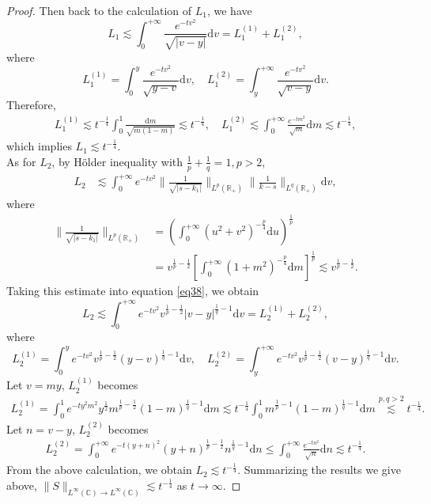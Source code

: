 \documentclass[10pt,a4paper]{amsart}
\begin{document}
\begin{proof}
Then back to the calculation of $L_1$, we have
\begin{equation}
    L_1\lesssim\int_0^{+\infty}\frac{e^{-t v^2}}{\sqrt{|v-y|}}\mathrm{d}v=L_1^{(1)}+L_1^{(2)},
\end{equation}
where
\begin{equation*}
     L_1^{(1)}=\int_0^{y}\frac{e^{-t v^2}}{\sqrt{y-v}}\mathrm{d}v,\quad L_1^{(2)}=\int_y^{+\infty}\frac{e^{-t v^2}}{\sqrt{v-y}}\mathrm{d}v.
\end{equation*}
Therefore,
\begin{align*}
     L_1^{(1)}\lesssim t^{-\frac{1}{4}}\int_0^1\frac{\mathrm{d}m}{\sqrt{m(1-m)}}\lesssim t^{-\frac{1}{4}},\quad L_1^{(2)}\lesssim \int_0^{+\infty}\frac{e^{-tm^2}}{\sqrt{m}}\mathrm{d}m\lesssim t^{-\frac{1}{4}},
\end{align*}
which implies $L_1\lesssim t^{-\frac{1}{4}}$.\\
As for $L_2$, by H\"older inequality with $\frac{1}{p} + \frac{1}{q} = 1,p>2$,
\begin{align}\label{eq38}
    L_2&\lesssim \int_0^{+\infty}e^{-t v^2}\|\frac{1}{\sqrt{|s-k_1|}}\|_{L^p(\mathbb{R}_+)}\|\frac{1}{k-s}\|_{L^q(\mathbb{R}_+)}\mathrm{d}v,
\end{align}
where
\begin{align*}
    \|\frac{1}{\sqrt{|s-k_1|}}\|_{L^p(\mathbb{R}_+)}&=\left(\int_0^{+\infty}\left(u^2+v^2\right)^{-\frac{p}{4}}\mathrm{d}u\right)^{\frac{1}{p}}\\
    &=v^{\frac{1}{p}-\frac{1}{2}}\left[\int_0^{+\infty}\left(1+m^2\right)^{-\frac{p}{4}}\mathrm{d}m\right]^{\frac{1}{p}}\lesssim v^{\frac{1}{p}-\frac{1}{2}}.
\end{align*}
Taking this estimate into equation \eqref{eq38}, we obtain
\begin{equation*}
    L_2\lesssim\int_0^{+\infty}e^{-t v^2}v^{\frac{1}{p}-\frac{1}{2}}|v-y|^{\frac{1}{q}-1}\mathrm{d}v=L_2^{(1)}+L_2^{(2)},
\end{equation*}
where
\begin{equation*}
    L_2^{(1)}=\int_0^{y}e^{-t v^2}v^{\frac{1}{p}-\frac{1}{2}}(y-v)^{\frac{1}{q}-1}\mathrm{d}v,\quad L_2^{(2)}=\int_y^{+\infty}e^{-t v^2}v^{\frac{1}{p}-\frac{1}{2}}(v-y)^{\frac{1}{q}-1}\mathrm{d}v.
\end{equation*}
Let $v=my$,  $L_2^{(1)}$ becomes
\begin{align*}
    L_2^{(1)}=\int_0^1e^{- ty^2m^2}y^{\frac{1}{2}}m^{\frac{1}{p}-\frac{1}{2}}(1-m)^{\frac{1}{q}-1}\mathrm{d}m\lesssim t^{-\frac{1}{4}}\int_0^1m^{\frac{1}{p}-1}(1-m)^{\frac{1}{q}-1}\mathrm{d}m\overset{{p,q>2}}\lesssim t^{-\frac{1}{4}}.
\end{align*}
Let $n=v-y$,  $L_2^{(2)}$ becomes
\begin{align*}
    L_2^{(2)}=\int_0^{+\infty}e^{-t(y+n)^2}(y+n)^{\frac{1}{p}-\frac{1}{2}}n^{\frac{1}{q}-1}\mathrm{d}n\leqslant \int_0^{+\infty}\frac{e^{- tn^2}}{\sqrt{n}}\mathrm{d}n\lesssim t^{-\frac{1}{4}}.
\end{align*}
From the above calculation, we obtain $L_2\lesssim t^{-\frac{1}{4}}$. Summarizing the results we give above,  $\|S\|_{L^\infty(\mathbb{C}) \to L^\infty(\mathbb{C})} \lesssim t^{-\frac{1}{4}}$ as $t\to\infty$.
\end{proof}
\end{document}
